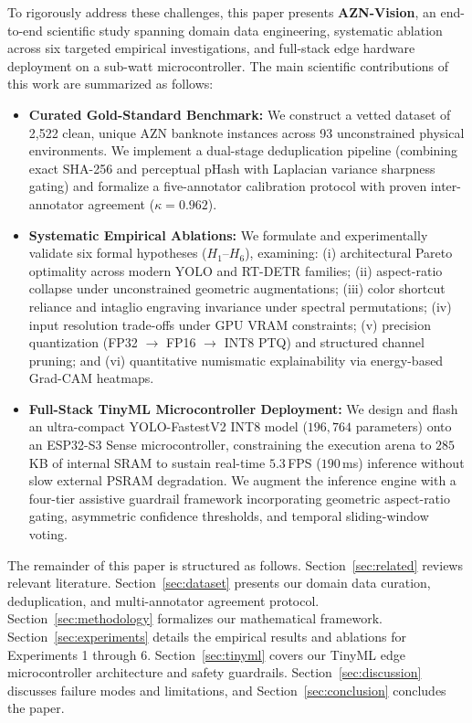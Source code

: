 \documentclass[conference]{IEEEtran}
\begin{document}
To rigorously address these challenges, this paper presents \textbf{AZN-Vision}, an end-to-end scientific study spanning domain data engineering, systematic ablation across six targeted empirical investigations, and full-stack edge hardware deployment on a sub-watt microcontroller. The main scientific contributions of this work are summarized as follows:
\begin{itemize}
    \item \textbf{Curated Gold-Standard Benchmark:} We construct a vetted dataset of 2,522 clean, unique AZN banknote instances across 93 unconstrained physical environments. We implement a dual-stage deduplication pipeline (combining exact SHA-256 and perceptual pHash with Laplacian variance sharpness gating) and formalize a five-annotator calibration protocol with proven inter-annotator agreement ($\kappa = 0.962$).
    \item \textbf{Systematic Empirical Ablations:} We formulate and experimentally validate six formal hypotheses ($H_1$--$H_6$), examining: (i) architectural Pareto optimality across modern YOLO and RT-DETR families; (ii) aspect-ratio collapse under unconstrained geometric augmentations; (iii) color shortcut reliance and intaglio engraving invariance under spectral permutations; (iv) input resolution trade-offs under GPU VRAM constraints; (v) precision quantization (FP32 $\to$ FP16 $\to$ INT8 PTQ) and structured channel pruning; and (vi) quantitative numismatic explainability via energy-based Grad-CAM heatmaps.
    \item \textbf{Full-Stack TinyML Microcontroller Deployment:} We design and flash an ultra-compact YOLO-FastestV2 INT8 model ($196,764$ parameters) onto an ESP32-S3 Sense microcontroller, constraining the execution arena to $285$\,KB of internal SRAM to sustain real-time $5.3$\,FPS ($190$\,ms) inference without slow external PSRAM degradation. We augment the inference engine with a four-tier assistive guardrail framework incorporating geometric aspect-ratio gating, asymmetric confidence thresholds, and temporal sliding-window voting.
\end{itemize}

The remainder of this paper is structured as follows. Section~\ref{sec:related} reviews relevant literature. Section~\ref{sec:dataset} presents our domain data curation, deduplication, and multi-annotator agreement protocol. Section~\ref{sec:methodology} formalizes our mathematical framework. Section~\ref{sec:experiments} details the empirical results and ablations for Experiments 1 through 6. Section~\ref{sec:tinyml} covers our TinyML edge microcontroller architecture and safety guardrails. Section~\ref{sec:discussion} discusses failure modes and limitations, and Section~\ref{sec:conclusion} concludes the paper.
\end{document}
